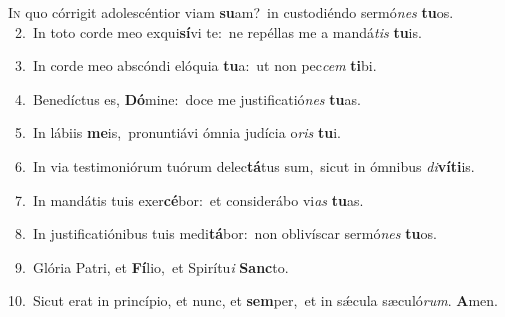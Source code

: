 \lettrine{\initial\textcolor{\initialcolor}{I}}{n} quo córrigit adolescéntior viam \textbf{su}\-am?~\star in custodiéndo sermó\textit{nes} \textbf{tu}\-os.\\
{\numbfont\textcolor{\numbcolor}{~2.}}~In toto corde meo exqui\-\textbf{sí}\-vi te:~\star ne repéllas me a mandá\textit{tis} \textbf{tu}\-is.\par
{\numbfont\textcolor{\numbcolor}{~3.}}~In corde meo abscóndi elóquia \textbf{tu}\-a:~\star ut non pec\textit{cem} \textbf{ti}\-bi.\par
{\numbfont\textcolor{\numbcolor}{~4.}}~Benedíctus es, \textbf{Dó}\-mine:~\star doce me justificatió\textit{nes} \textbf{tu}\-as.\par
{\numbfont\textcolor{\numbcolor}{~5.}}~In lábiis \textbf{me}\-is,~\star pronuntiávi ómnia judícia o\textit{ris} \textbf{tu}\-i.\par
{\numbfont\textcolor{\numbcolor}{~6.}}~In via testimoniórum tuórum delec\-\textbf{tá}\-tus sum,~\star sicut in ómnibus \textit{di}\-\textbf{ví}\textbf{ti}is.\par
{\numbfont\textcolor{\numbcolor}{~7.}}~In mandátis tuis exer\-\textbf{cé}\-bor:~\star et considerábo vi\textit{as} \textbf{tu}\-as.\par
{\numbfont\textcolor{\numbcolor}{~8.}}~In justificatiónibus tuis medi\-\textbf{tá}\-bor:~\star non oblivíscar sermó\textit{nes} \textbf{tu}\-os.\par
{\numbfont\textcolor{\numbcolor}{~9.}}~Glória Patri, et \textbf{Fí}\-lio,~\star et Spirítu\textit{i} \textbf{Sanc}\-to.\par
{\numbfont\textcolor{\numbcolor}{10.}}~Sicut erat in princípio, et nunc, et \textbf{sem}\-per,~\star et in sǽcula sæculó\-\textit{rum}\-. \textbf{A}\-men.\par
